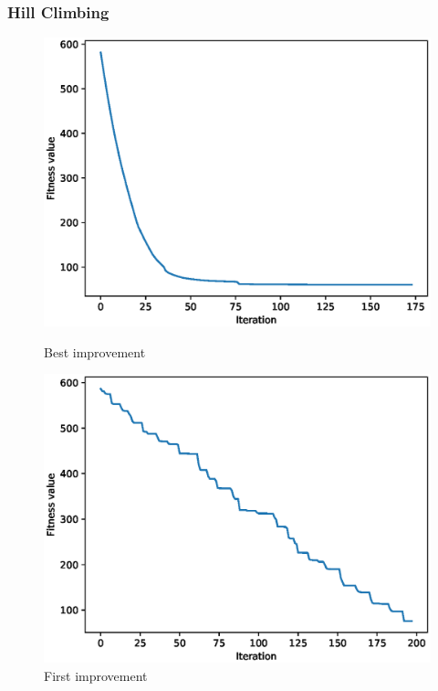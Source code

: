 \documentclass{article}
\begin{document}
\subsubsection{Hill Climbing}
\begin{figure}[!htbp]
	\centering
	\begin{minipage}{.48\textwidth}
		\centering
		\includegraphics[scale=.4]{experiment_2a_rastrigin/max_fitness_0.eps}
		\caption{Best improvement}
	\end{minipage}\hfill
	\begin{minipage}{.48\textwidth}
		\centering
		\includegraphics[scale=.4]{experiment_2b_rastrigin/max_fitness_0.eps}
		\caption{First improvement}
	\end{minipage}\hfill
\end{figure}
\FloatBarrier
\end{document}
